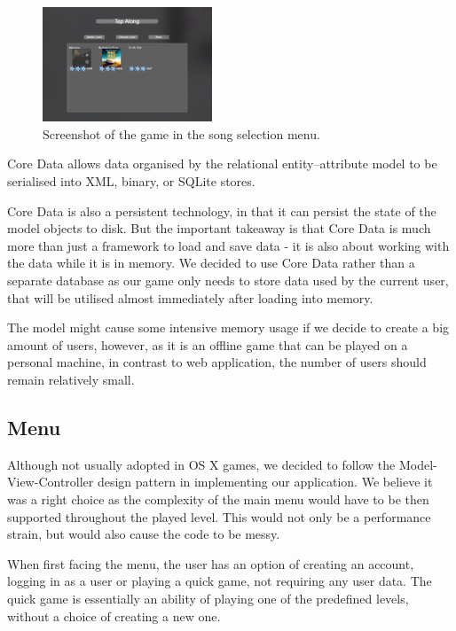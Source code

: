 \begin{figure}
  \begin{center}
    \includegraphics[width=0.45\textwidth]{Figures/CollectionView}
  \end{center}
  \caption{Screenshot of the game in the song selection menu.}
\label{fig:songselection}
\end{figure}

Core Data allows data organised by the relational entity–attribute model to be serialised into XML, binary, or SQLite stores.

Core Data is also a persistent technology, in that it can persist the state of the model objects to disk. But the important takeaway is that Core Data is much more than just a framework to load and save data - it is also about working with the data while it is in memory.
We decided to use Core Data rather than a separate database as our game only needs to store data used by the current user, that will be utilised almost immediately after loading into memory. 
  
The model might cause some intensive memory usage if we decide to create a big amount of users, however, as it is an offline game that can be played on a personal machine, in contrast to web application, the number of users should remain relatively small.

\vspace{10pt}

\subsection{Menu}

Although not usually adopted in OS X games, we decided to follow the Model-View-Controller design pattern in implementing our application. We believe it was a right choice as the complexity of the main menu would have to be then supported throughout the played level. This would not only be a performance strain, but would also cause the code to be messy.

When first facing the menu, the user has an option of creating an account, logging in as a user or playing a quick game, not requiring any user data. 
The quick game is essentially an ability of playing one of the predefined levels, without a choice of creating a new one.

